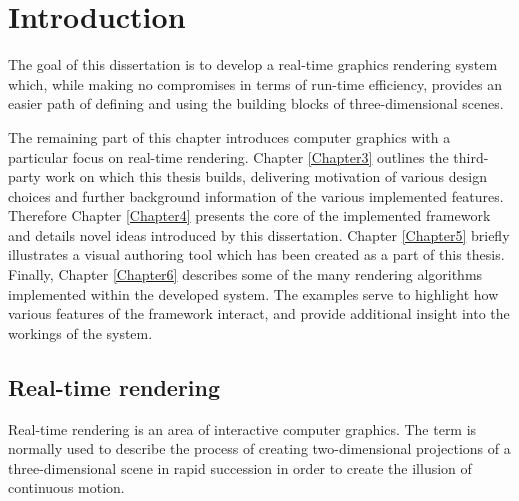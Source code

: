 
\chapter{ Introduction }
\label{Chapter1}

The goal of this dissertation is to develop a real-time graphics rendering system which, while making no compromises in terms of run-time efficiency, provides an easier path of defining and using the building blocks of three-dimensional scenes.

The remaining part of this chapter introduces computer graphics with a particular focus on real-time rendering. Chapter \ref{Chapter3} outlines the third-party work on which this thesis builds, delivering motivation of various design choices and further background information of the various implemented features. Therefore Chapter \ref{Chapter4} presents the core of the implemented framework and details novel ideas introduced by this dissertation. Chapter \ref{Chapter5} briefly illustrates a visual authoring tool which has been created as a part of this thesis. Finally, Chapter \ref{Chapter6} describes some of the many rendering algorithms implemented within the developed system. The examples serve to highlight how various features of the framework interact, and provide additional insight into the workings of the system.

\section{Real-time rendering}

Real-time rendering is an area of interactive computer graphics. The term is normally used to describe the process of creating two-dimensional projections of a three-dimensional scene in rapid succession in order to create the illusion of continuous motion.

